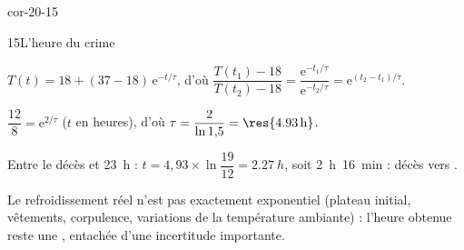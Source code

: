 \begin{blocLivre}{cor-20-15}
\begin{corrige}{15}{L'heure du crime}
\begin{questions}
\item $T(t)=18+(37-18)\,\mathrm{e}^{-t/\tau}$, d'où $\dfrac{T(t_1)-18}{T(t_2)-18}=\dfrac{\mathrm{e}^{-t_1/\tau}}{\mathrm{e}^{-t_2/\tau}}=\mathrm{e}^{(t_2-t_1)/\tau}$.
\item $\dfrac{12}{8}=\mathrm{e}^{2/\tau}$ ($t$ en heures), d'où $\tau=\dfrac{2}{\ln1{,}5}=\res{\qty{4,93}{h}}$.
\item Entre le décès et 23~h : $t=4{,}93\times\ln\dfrac{19}{12}=\qty{2,27}{h}$, soit 2~h~16~min : décès vers .
\item Le refroidissement réel n'est pas exactement exponentiel (plateau initial, vêtements, corpulence, variations de la
température ambiante) : l'heure obtenue reste une , entachée d'une incertitude importante.
\end{questions}
\end{corrige}
\end{blocLivre}
